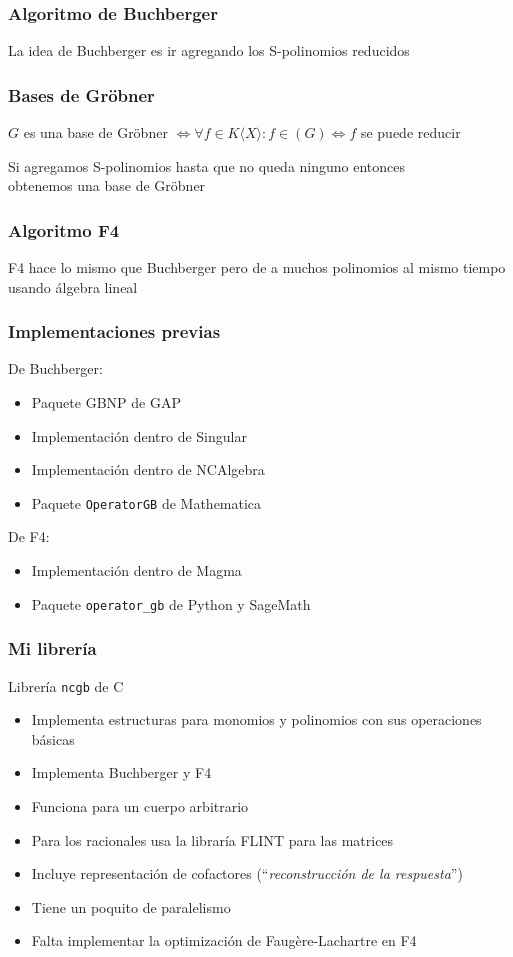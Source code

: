 \documentclass[spanish, aspectratio=169, hidecontrols]{beamer}
\newcommand\cpp{C\nolinebreak[4]\hspace{-.05em}\raisebox{.4ex}{\relsize{-3}{\textbf{++}}}\xspace}
\begin{document}
\begin{frame}
  \frametitle{Algoritmo de Buchberger}
  \pause

  La idea de Buchberger es ir agregando los S-polinomios reducidos
\end{frame}

\begin{frame}
  \frametitle{Bases de Gröbner}
  $G$ es una base de Gröbner $⇔ ∀f ∈ K⟨X⟩ : f ∈ (G) ⇔ f$ se puede reducir \\

  \pause

  Si agregamos S-polinomios hasta que no queda ninguno entonces \\ obtenemos una base de Gröbner
\end{frame}

\begin{frame}
  \frametitle{Algoritmo F4}
  \pause

  F4 hace lo mismo que Buchberger pero de a muchos polinomios al mismo tiempo usando álgebra lineal
\end{frame}

\begin{frame}
  \frametitle{Implementaciones previas}
  \pause
  De Buchberger:
  \begin{itemize}
    \item Paquete GBNP de GAP
    \item Implementación dentro de Singular
    \item Implementación dentro de NCAlgebra
    \item Paquete \texttt{OperatorGB} de Mathematica
  \end{itemize}
  \pause
  De F4:
  \begin{itemize}
    \item Implementación dentro de Magma
    \item Paquete \texttt{operator\_gb} de Python y SageMath
  \end{itemize}
\end{frame}

\begin{frame}
  \frametitle{Mi librería}
  Librería \texttt{ncgb} de \cpp
  \pause
  \begin{itemize}
    \item Implementa estructuras para monomios y polinomios con sus operaciones básicas
    \pause
    \item Implementa Buchberger y F4
    \pause
    \item Funciona para un \alert{cuerpo arbitrario}
    \pause
    \item Para los racionales usa la libraría FLINT para las matrices
    \pause
    \item Incluye \alert{representación de cofactores} (``\textit{reconstrucción de la respuesta}'')
    \pause
    \item Tiene un poquito de paralelismo
    \pause
    \item Falta implementar la optimización de Faugère-Lachartre en F4
  \end{itemize}
\end{frame}
\end{document}
